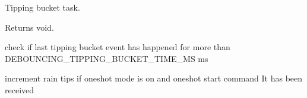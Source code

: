 Tipping bucket task. 

\begin{DoxyReturn}{Returns}
void. 
\end{DoxyReturn}
check if last tipping bucket event has happened for more than D\+E\+B\+O\+U\+N\+C\+I\+N\+G\+\_\+\+T\+I\+P\+P\+I\+N\+G\+\_\+\+B\+U\+C\+K\+E\+T\+\_\+\+T\+I\+M\+E\+\_\+\+MS ms

increment rain tips if oneshot mode is on and oneshot start command It has been received 